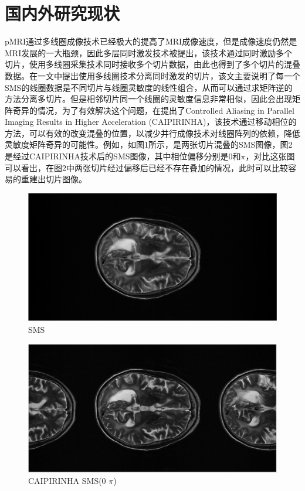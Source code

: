 \documentclass[UTF8]{article}
\begin{document}
\section{国内外研究现状}
\par pMRI通过多线圈成像技术已经极大的提高了MRI成像速度，但是成像速度仍然是MRI发展的一大瓶颈，因此多层同时激发技术被提出，该技术通过同时激励多个切片，使用多线圈采集技术同时接收多个切片数据，由此也得到了多个切片的混叠数据。在\cite{larkman2001use}一文中提出使用多线圈技术分离同时激发的切片，该文主要说明了每一个SMS的线圈数据是不同切片与线圈灵敏度的线性组合，从而可以通过求矩阵逆的方法分离多切片。但是相邻切片同一个线圈的灵敏度信息非常相似，因此会出现矩阵奇异的情况，为了有效解决这个问题，在\cite{breuer2005controlled}提出了Controlled Aliasing in Parallel Imaging Results in Higher Acceleration (CAIPIRINHA)，该技术通过移动相位的方法，可以有效的改变混叠的位置，以减少并行成像技术对线圈阵列的依赖，降低灵敏度矩阵奇异的可能性。例如，如图1所示，是两张切片混叠的SMS图像，图2是经过CAIPIRINHA技术后的SMS图像，其中相位偏移分别是0和$\pi$，对比这张图可以看出，在图2中两张切片经过偏移后已经不存在叠加的情况，此时可以比较容易的重建出切片图像。
\begin{figure}[ht]
	\centering
	\includegraphics[scale=0.3]{./image/1.jpg}
	\caption{SMS}
\end{figure}
\begin{figure}[ht]
	\centering
	\includegraphics[scale=0.3]{./image/2.jpg}
	\caption{CAIPIRINHA SMS(0 $\pi$)}
\end{figure}
\end{document}
